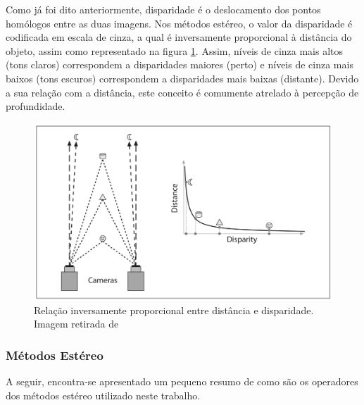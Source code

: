 Como já foi dito anteriormente, disparidade é o deslocamento dos pontos homólogos entre as duas imagens. Nos métodos estéreo, o valor da disparidade é codificada em escala de cinza, a qual é inversamente proporcional à distância do objeto, assim como representado na figura \ref{depth_disparity}. Assim, níveis de cinza mais altos (tons claros) correspondem a disparidades maiores (perto) e níveis de cinza mais baixos (tons escuros) correspondem a disparidades mais baixas (distante). Devido a sua relação com a distância, este conceito é comumente atrelado à percepção de profundidade.

\begin{figure}[H]
 	\centering
 	\includegraphics[scale=0.3]{./Resources/bradski/depth_disparity.png}
 	\caption{Relação inversamente proporcional entre distância e disparidade. Imagem retirada de \cite{Bradski2008}}
 	\label{depth_disparity}
\end{figure}

\subsubsection{Métodos Estéreo}

A seguir, encontra-se apresentado um pequeno resumo de como são os operadores dos métodos estéreo utilizado neste trabalho.

